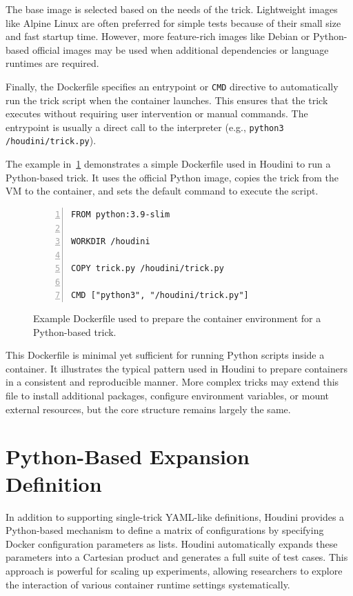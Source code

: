 \begin{doublespace}
The base image is selected based on the needs of the trick. Lightweight images like Alpine Linux are often preferred for simple tests because of their small size and fast startup time. However, more feature-rich images like Debian or Python-based official images may be used when additional dependencies or language runtimes are required.

Finally, the Dockerfile specifies an entrypoint or \texttt{CMD} directive to automatically run the trick script when the container launches. This ensures that the trick executes without requiring user intervention or manual commands. The entrypoint is usually a direct call to the interpreter (e.g., \texttt{python3 /houdini/trick.py}).

The example in~\ref{fig:dockerfile-example} demonstrates a simple Dockerfile used in Houdini to run a Python-based trick. It uses the official Python image, copies the trick from the VM to the container, and sets the default command to execute the script.

\begin{figure}[H]
\caption{Example Dockerfile used to prepare the container environment for a Python-based trick.}
\label{fig:dockerfile-example}
\begin{lstlisting}[numbers=left, numberstyle=\tiny, stepnumber=1, breaklines=true, frame=single, backgroundcolor=\color{gray!10}, basicstyle=\ttfamily\scriptsize, showspaces=false, showstringspaces=false]
FROM python:3.9-slim

WORKDIR /houdini

COPY trick.py /houdini/trick.py

CMD ["python3", "/houdini/trick.py"]
\end{lstlisting}
\end{figure}


This Dockerfile is minimal yet sufficient for running Python scripts inside a container. It illustrates the typical pattern used in Houdini to prepare containers in a consistent and reproducible manner. More complex tricks may extend this file to install additional packages, configure environment variables, or mount external resources, but the core structure remains largely the same.


\section{Python-Based Expansion Definition}

In addition to supporting single-trick YAML-like definitions, Houdini provides a Python-based mechanism to define a matrix of configurations by specifying Docker configuration parameters as lists. Houdini automatically expands these parameters into a Cartesian product and generates a full suite of test cases. This approach is powerful for scaling up experiments, allowing researchers to explore the interaction of various container runtime settings systematically.


\end{doublespace}
